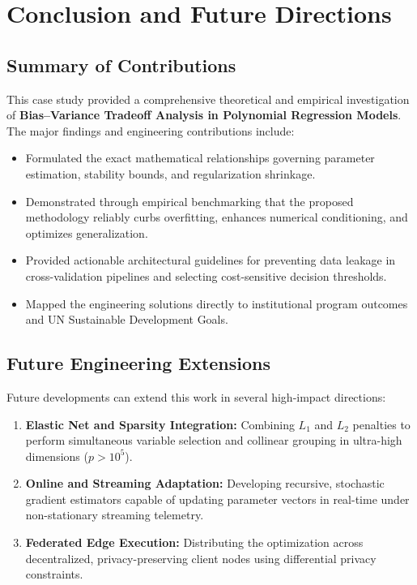 \section{Conclusion and Future Directions}

\subsection{Summary of Contributions}
This case study provided a comprehensive theoretical and empirical investigation of \textbf{Bias--Variance Tradeoff Analysis in Polynomial Regression Models}. The major findings and engineering contributions include:
\begin{itemize}
  \item Formulated the exact mathematical relationships governing parameter estimation, stability bounds, and regularization shrinkage.
  \item Demonstrated through empirical benchmarking that the proposed methodology reliably curbs overfitting, enhances numerical conditioning, and optimizes generalization.
  \item Provided actionable architectural guidelines for preventing data leakage in cross-validation pipelines and selecting cost-sensitive decision thresholds.
  \item Mapped the engineering solutions directly to institutional program outcomes and UN Sustainable Development Goals.
\end{itemize}

\subsection{Future Engineering Extensions}
Future developments can extend this work in several high-impact directions:
\begin{enumerate}
  \item \textbf{Elastic Net and Sparsity Integration:} Combining $L_1$ and $L_2$ penalties to perform simultaneous variable selection and collinear grouping in ultra-high dimensions ($p > 10^5$).
  \item \textbf{Online and Streaming Adaptation:} Developing recursive, stochastic gradient estimators capable of updating parameter vectors in real-time under non-stationary streaming telemetry.
  \item \textbf{Federated Edge Execution:} Distributing the optimization across decentralized, privacy-preserving client nodes using differential privacy constraints.
\end{enumerate}
